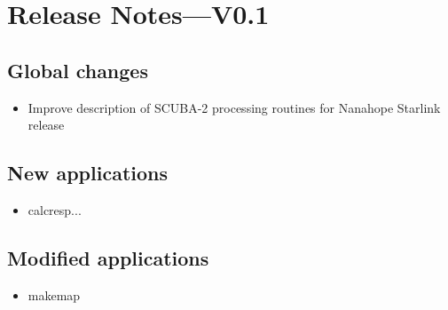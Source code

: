 \documentclass[twoside,11pt]{article}
\renewcommand{\_}{\texttt{\symbol{95}}}
\begin{document}
\section{Release Notes---V0.1}

\subsection{Global changes}
\begin{itemize}
  \item Improve description of SCUBA-2 processing routines for Nanahope Starlink release
\end{itemize}

\subsection{New applications}
\begin{itemize}
  \item calcresp...
\end{itemize}

\subsection{Modified applications}
\begin{itemize}
  \item makemap
\end{itemize}
\end{document}
